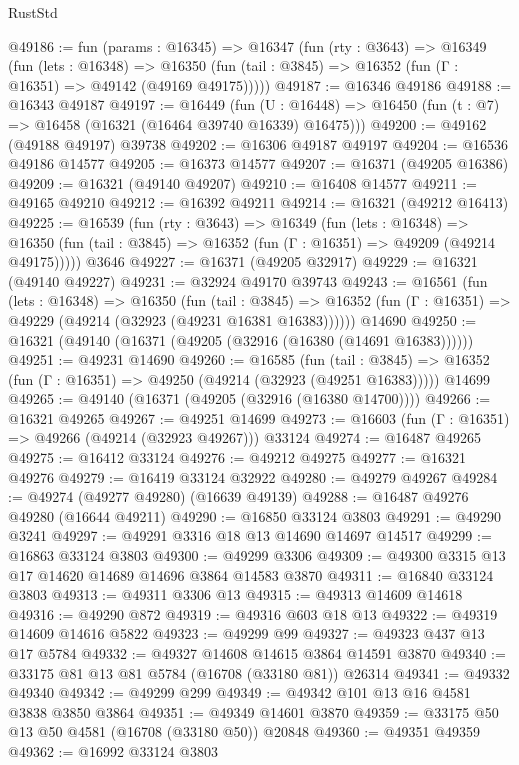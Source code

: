 \begin{lexlean}{RustStd}
\begin{coremodule}
@49186 := fun (params : @16345) =>
  @16347
    (fun (rty : @3643) =>
    @16349
      (fun (lets : @16348) =>
      @16350 (fun (tail : @3845) => @16352 (fun (Γ : @16351) => @49142 (@49169 @49175)))))
@49187 := @16346 @49186
@49188 := @16343 @49187
@49197 := @16449
    (fun (U : @16448) => @16450 (fun (t : @7) => @16458 (@16321 (@16464 @39740 @16339) @16475)))
@49200 := @49162 (@49188 @49197) @39738
@49202 := @16306 @49187 @49197
@49204 := @16536 @49186 @14577
@49205 := @16373 @14577
@49207 := @16371 (@49205 @16386)
@49209 := @16321 (@49140 @49207)
@49210 := @16408 @14577
@49211 := @49165 @49210
@49212 := @16392 @49211
@49214 := @16321 (@49212 @16413)
@49225 := @16539
    (fun (rty : @3643) =>
    @16349
      (fun (lets : @16348) =>
      @16350 (fun (tail : @3845) => @16352 (fun (Γ : @16351) => @49209 (@49214 @49175)))))
    @3646
@49227 := @16371 (@49205 @32917)
@49229 := @16321 (@49140 @49227)
@49231 := @32924 @49170 @39743
@49243 := @16561
    (fun (lets : @16348) =>
    @16350
      (fun (tail : @3845) =>
      @16352 (fun (Γ : @16351) => @49229 (@49214 (@32923 (@49231 @16381 @16383))))))
    @14690
@49250 := @16321 (@49140 (@16371 (@49205 (@32916 (@16380 (@14691 @16383))))))
@49251 := @49231 @14690
@49260 := @16585
    (fun (tail : @3845) => @16352 (fun (Γ : @16351) => @49250 (@49214 (@32923 (@49251 @16383)))))
    @14699
@49265 := @49140 (@16371 (@49205 (@32916 (@16380 @14700))))
@49266 := @16321 @49265
@49267 := @49251 @14699
@49273 := @16603 (fun (Γ : @16351) => @49266 (@49214 (@32923 @49267))) @33124
@49274 := @16487 @49265
@49275 := @16412 @33124
@49276 := @49212 @49275
@49277 := @16321 @49276
@49279 := @16419 @33124 @32922
@49280 := @49279 @49267
@49284 := @49274 (@49277 @49280) (@16639 @49139)
@49288 := @16487 @49276 @49280 (@16644 @49211)
@49290 := @16850 @33124 @3803
@49291 := @49290 @3241
@49297 := @49291 @3316 @18 @13 @14690 @14697 @14517
@49299 := @16863 @33124 @3803
@49300 := @49299 @3306
@49309 := @49300 @3315 @13 @17 @14620 @14689 @14696 @3864 @14583 @3870
@49311 := @16840 @33124 @3803
@49313 := @49311 @3306 @13
@49315 := @49313 @14609 @14618
@49316 := @49290 @872
@49319 := @49316 @603 @18 @13
@49322 := @49319 @14609 @14616 @5822
@49323 := @49299 @99
@49327 := @49323 @437 @13 @17 @5784
@49332 := @49327 @14608 @14615 @3864 @14591 @3870
@49340 := @33175 @81 @13 @81 @5784 (@16708 (@33180 @81)) @26314
@49341 := @49332 @49340
@49342 := @49299 @299
@49349 := @49342 @101 @13 @16 @4581 @3838 @3850 @3864
@49351 := @49349 @14601 @3870
@49359 := @33175 @50 @13 @50 @4581 (@16708 (@33180 @50)) @20848
@49360 := @49351 @49359
@49362 := @16992 @33124 @3803

\end{coremodule}
\end{lexlean}
